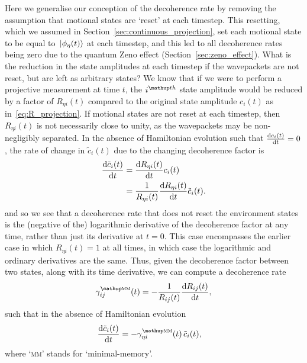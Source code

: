 Here we generalise our conception of the decoherence rate by removing the assumption that motional states are `reset' at each timestep. This resetting, which we assumed in Section~\ref{sec:continuous_projection}, set each motional state to be equal to $\ket{\phi_\eta(t)}$ at each timestep, and this led to all decoherence rates being zero due to the quantum Zeno effect (Section~\ref{sec:zeno_effect}). What is the reduction in the state amplitudes at each timestep if the wavepackets are not reset, but are left as arbitrary states? We know that if we were to perform a projective measurement at time $t$, the $i^\up{th}$ state amplitude would be reduced by a factor of $R_{\eta i}(t)$ compared to the original state amplitude $c_i(t)$ as in~\eqref{eq:R_projection}. If motional states are not reset at each timestep, then $R_{\eta i}(t)$ is not necessarily close to unity, as the wavepackets may be non-negligibly separated. In the absence of Hamiltonian evolution such that $\dv{c_i(t)}{t}=0$, the rate of change in $\tilde c_i(t)$ due to the changing decoherence factor is
\begin{align}
\dv{\tilde c_i(t)}{t} &= \dv{R_{\eta i}(t)}{t} c_i(t)\\
&= \frac1{R_{\eta i}(t)}\dv{R_{\eta i}(t)}{t} \tilde c_i(t).
\end{align}
and so we see that a decoherence rate that does not reset the environment states is the (negative of the) logarithmic derivative of the decoherence factor at any time, rather than just its derivative at $t=0$. This case encompasses the earlier case in which $R_{\eta i}(t) = 1$ at all times, in which case the logarithmic and ordinary derivatives are the same. Thus, given the decoherence factor between two states, along with its time derivative, we can compute a decoherence rate
\begin{align}
\gamma^\up{\textsc{mm}}_{ij}(t) =  -\frac1{R_{ij}(t)}\dv{R_{ij}(t)}{t},
\end{align}
such that in the absence of Hamiltonian evolution
\begin{align}
\dv{\tilde c_i(t)}{t} &= -\gamma^\up{\textsc{mm}}_{\eta i}(t)\,\tilde c_i(t),
\end{align}
where `\textsc{mm}' stands for `minimal-memory'.

